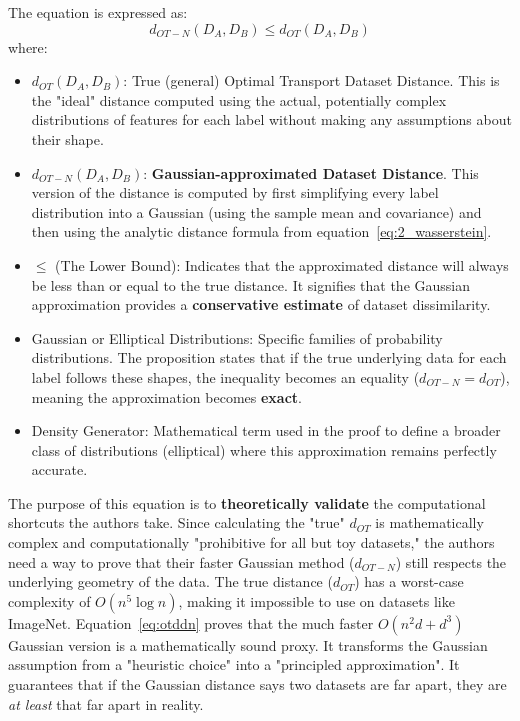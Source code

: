 \documentclass[11pt, a4paper]{article}
\theoremstyle{plain} %
\theoremstyle{definition} %
\begin{document}
			The equation is expressed as:
			\begin{equation}
				\label{eq:otddn}
				d_{OT-N}(D_A, D_B) \leq d_{OT}(D_A, D_B)
			\end{equation}
			where:
			\begin{itemize}
				\item $d_{OT}(D_A, D_B)$: True (general) Optimal Transport Dataset Distance. This is the "ideal" distance computed using the actual, potentially complex distributions of features for each label without making any assumptions about their shape.
				\item $d_{OT-N}(D_A, D_B)$: \textbf{Gaussian-approximated Dataset Distance}. This version of the distance is computed by first simplifying every label distribution into a Gaussian (using the sample mean and covariance) and then using the analytic distance formula from equation~\ref{eq:2_wasserstein}.
				\item $\leq$ (The Lower Bound): Indicates that the approximated distance will always be less than or equal to the true distance. It signifies that the Gaussian approximation provides a \textbf{conservative estimate} of dataset dissimilarity.
				\item Gaussian or Elliptical Distributions: Specific families of probability distributions. The proposition states that if the true underlying data for each label follows these shapes, the inequality becomes an equality ($d_{OT-N} = d_{OT}$), meaning the approximation becomes \textbf{exact}.
				\item Density Generator: Mathematical term used in the proof to define a broader class of distributions (elliptical) where this approximation remains perfectly accurate.
			\end{itemize}
			The purpose of this equation is to \textbf{theoretically validate} the computational shortcuts the authors take. Since calculating the "true" $d_{OT}$ is mathematically complex and computationally "prohibitive for all but toy datasets," the authors need a way to prove that their faster Gaussian method ($d_{OT-N}$) still respects the underlying geometry of the data. The true distance ($d_{OT}$) has a worst-case complexity of $O(n^5 \log n)$, making it impossible to use on datasets like ImageNet. Equation~\ref{eq:otddn} proves that the much faster $O(n^2d + d^3)$ Gaussian version is a mathematically sound proxy. It transforms the Gaussian assumption from a "heuristic choice" into a "principled approximation". It guarantees that if the Gaussian distance says two datasets are far apart, they are \textit{at least} that far apart in reality.
\end{document}
